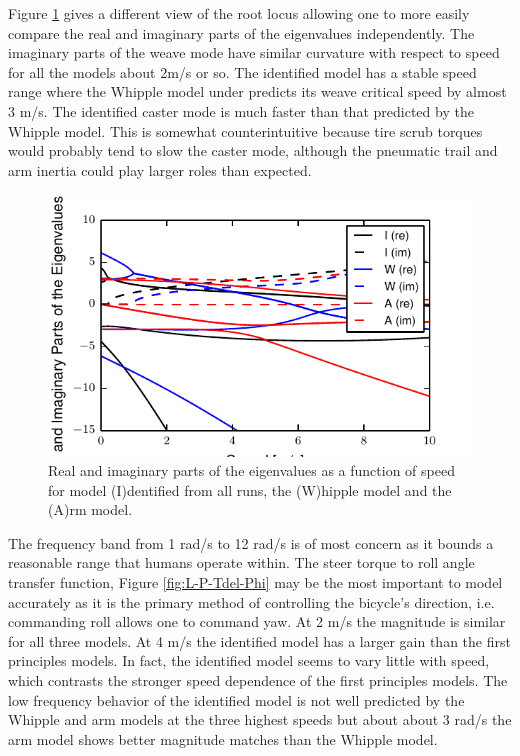 \documentclass[a4paper]{article}
\begin{document}
Figure \ref{fig:L-P-eig} gives a different view of the root locus allowing one
to more easily compare the real and imaginary parts of the eigenvalues
independently. The imaginary parts of the weave mode have similar curvature
with respect to speed for all the models about 2m/s or so. The identified model
has a stable speed range where the Whipple model under predicts its weave
critical speed by almost 3 m/s. The identified caster mode is much faster than
that predicted by the Whipple model. This is somewhat counterintuitive
because tire scrub torques would probably tend to slow the caster mode, although 
the pneumatic trail and  arm inertia could play larger
roles than expected.

\begin{figure}
  \label{fig:L-P-eig}
  \includegraphics[width=5in]{figures/L-P-eig.pdf}
  \caption{Real and imaginary parts of the eigenvalues as a function of speed
    for model (I)dentified from all runs, the (W)hipple model and the (A)rm
  model.}
\end{figure}

The frequency band from 1 rad/s to 12 rad/s is of most concern as it bounds a
reasonable range that humans operate within. The steer torque
to roll angle transfer function, Figure \ref{fig:L-P-Tdel-Phi} may be the most
important to model accurately as it is the primary method of controlling the
bicycle's direction, i.e. commanding roll allows one to command yaw. At 2 m/s
the magnitude is similar for all three models. At 4 m/s the identified model
has a larger gain than the first principles models. In fact, the identified
model seems to vary little with speed, which contrasts the stronger speed
dependence of the first principles models. The low frequency behavior of the
identified model is not well predicted by the Whipple and arm models at the
three highest speeds but about about 3 rad/s the arm model shows better
magnitude matches than the Whipple model.
\end{document}
